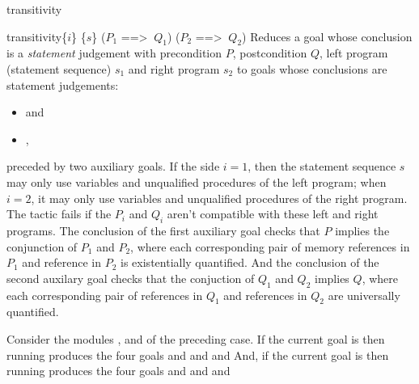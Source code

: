 \begin{tactic}{transitivity}
\begin{tsyntax}{transitivity\{$i$\} \{$s$\} ($P_1$ ==> $\ Q_1$) ($P_2$ ==> $\ Q_2$)}
    Reduces a goal whose conclusion is a \prhl \emph{statement}
    judgement with precondition $P$, postcondition $Q$, left program
    (statement sequence) $s_1$ and right program $s_2$ to goals whose
    conclusions are \prhl statement judgements:
    \begin{itemize}
    \item {} and
    \item {},
    \end{itemize}
    preceded by two auxiliary goals. If the side $i=1$, then the
    statement sequence $s$ may only use variables and unqualified
    procedures of the left program; when $i=2$, it may only use
    variables and unqualified procedures of the right program. The
    tactic fails if the $P_i$ and $Q_i$ aren't compatible with these
    left and right programs.  The conclusion of the first auxiliary
    goal checks that $P$ implies the conjunction of $P_1$ and $P_2$,
    where each corresponding pair of  memory references in
    $P_1$ and  reference in $P_2$ is existentially quantified.
    And the conclusion of the second auxilary goal checks that the
    conjuction of $Q_1$ and $Q_2$ implies $Q$, where each
    corresponding pair of  references in $Q_1$ and 
    references in $Q_2$ are universally quantified.

  \medskip Consider the modules ,  and  of the
  preceding case.  If the current goal is
   then
  running 
  produces the four goals
   and
   and
   and
   And, if
  the current goal is
   then
  running 
  produces the four goals
   and
   and
   and
  \end{tsyntax}
\end{tactic}

